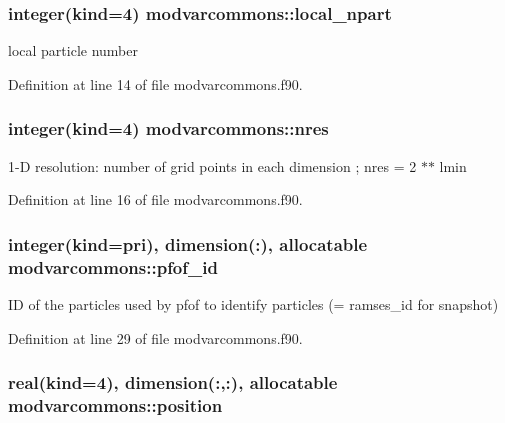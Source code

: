 \hypertarget{classmodvarcommons_ac6a221a790865b56b21df2f1cb544e4c}{
\subsubsection[{local\-\_\-npart}]{\setlength{\rightskip}{0pt plus 5cm}integer(kind=4) modvarcommons\-::local\-\_\-npart}}\label{classmodvarcommons_ac6a221a790865b56b21df2f1cb544e4c}


local particle number 



Definition at line 14 of file modvarcommons.\-f90.

\hypertarget{classmodvarcommons_ad7c50fb83d1dfe26ec032d10928a5f77}{
\subsubsection[{nres}]{\setlength{\rightskip}{0pt plus 5cm}integer(kind=4) modvarcommons\-::nres}}\label{classmodvarcommons_ad7c50fb83d1dfe26ec032d10928a5f77}


1-\/\-D resolution\-: number of grid points in each dimension ; nres = 2 $\ast$$\ast$ lmin 



Definition at line 16 of file modvarcommons.\-f90.

\hypertarget{classmodvarcommons_ac41f2f8ba4836f86de4c566f01b7f4c9}{
\subsubsection[{pfof\-\_\-id}]{\setlength{\rightskip}{0pt plus 5cm}integer(kind=pri), dimension(\-:), allocatable modvarcommons\-::pfof\-\_\-id}}\label{classmodvarcommons_ac41f2f8ba4836f86de4c566f01b7f4c9}


I\-D of the particles used by pfof to identify particles (= ramses\-\_\-id for snapshot) 



Definition at line 29 of file modvarcommons.\-f90.

\hypertarget{classmodvarcommons_a1b79bd5412057e847c022c233c3919cf}{
\subsubsection[{position}]{\setlength{\rightskip}{0pt plus 5cm}real(kind=4), dimension(\-:,\-:), allocatable modvarcommons\-::position}}\label{classmodvarcommons_a1b79bd5412057e847c022c233c3919cf}


